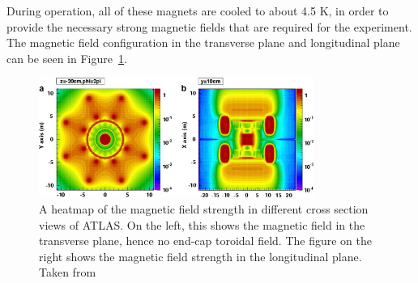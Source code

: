 During operation, all of these magnets are cooled to about 4.5 K, in order to provide the necessary strong magnetic fields that are required for the experiment.
The magnetic field configuration in the transverse plane and longitudinal plane can be seen in Figure~\ref{fig:atlas_magnetic_field_map}.

\begin{figure}[pht]
    \centering
    \includegraphics[width=0.8\textwidth]{figures/atlas/atlas_magnetic_field.jpg}
    \caption{A heatmap of the magnetic field strength in different cross section views of ATLAS\@. On the left, this shows the magnetic field in the transverse plane, hence no end-cap toroidal field. The figure on the right shows the magnetic field strength in the longitudinal plane. Taken from~\cite{atlas_magnetic_field_map}}\label{fig:atlas_magnetic_field_map}
\end{figure}